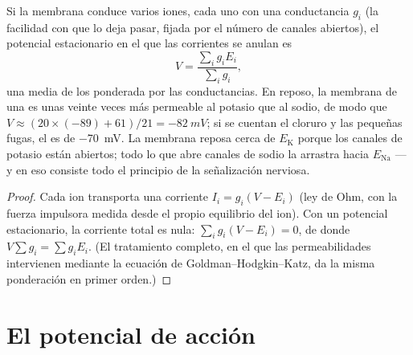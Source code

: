 \begin{theorem}\label{thm:b2:neurons-synapses:chord}
Si la membrana conduce varios iones, cada uno con una conductancia $g_i$
(la facilidad con que lo deja pasar, fijada por el número de canales
abiertos), el potencial estacionario en el que las corrientes se anulan es
\[
V = \frac{\sum_i g_i E_i}{\sum_i g_i},
\]
una media de los  ponderada por las
conductancias. En reposo, la membrana de una  es unas veinte veces
más permeable al potasio que al sodio, de modo que $V \approx (20\times(-89) +
61)/21 = \qty{-82}{mV}$; si se cuentan el cloruro y las pequeñas fugas, el
 es de \qty{-70}{mV}. La membrana reposa cerca de
$E_{\mathrm K}$ porque los canales de potasio están abiertos; todo lo que
abre canales de sodio la arrastra hacia $E_{\mathrm{Na}}$ --- y en eso
consiste todo el principio de la señalización nerviosa.
\end{theorem}
\begin{proof}
Cada ion transporta una corriente $I_i = g_i(V - E_i)$ (ley de Ohm, con la
fuerza impulsora medida desde el propio equilibrio del ion). Con un
potencial estacionario, la corriente total es nula: $\sum_i g_i(V - E_i) =
0$, de donde $V\sum g_i = \sum g_iE_i$. (El tratamiento completo, en el
que las permeabilidades intervienen mediante la ecuación de
Goldman--Hodgkin--Katz, da la misma ponderación en primer orden.)
\end{proof}
\section{El potencial de acción}

